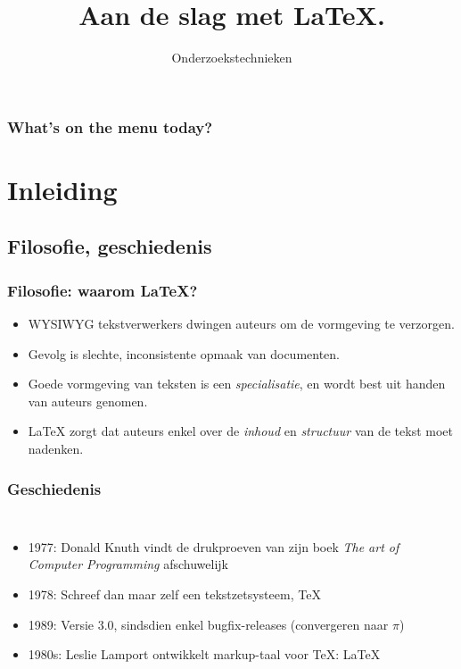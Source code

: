 \documentclass[aspectratio=169]{beamer}
\title{Aan de slag met \LaTeX.}
\subtitle{Onderzoekstechnieken}
\begin{document}
\begin{frame}
  \maketitle
\end{frame}

\begin{frame}
  \frametitle{What's on the menu today?}

  \tableofcontents
\end{frame}


\section{Inleiding}

\subsection{Filosofie, geschiedenis}

\begin{frame}
  \frametitle{Filosofie: waarom {\LaTeX}?}

  \begin{itemize}
    \item<+-> WYSIWYG tekstverwerkers dwingen auteurs om de vormgeving te verzorgen.
    \item<+-> Gevolg is slechte, inconsistente opmaak van documenten.
    \item<+-> Goede vormgeving van teksten is een \textit{specialisatie}, en wordt best
    uit handen van auteurs genomen.
    \item<+-> {\LaTeX} zorgt dat auteurs enkel over de \textit{inhoud} en \textit{structuur} van de tekst moet nadenken.
  \end{itemize}
\end{frame}

\begin{frame}[plain]
  \frametitle{Geschiedenis}

  \begin{columns}[c]

    \begin{itemize}
      \item<+-> 1977: Donald Knuth vindt de drukproeven van zijn boek \textit{The art of Computer Programming} afschuwelijk
      \item<+-> 1978: Schreef dan maar zelf een tekstzetsysteem, {\TeX}
      \item<+-> 1989: Versie 3.0, sindsdien enkel bugfix-releases (convergeren naar \(\pi\))
      \item<+-> 1980s: Leslie Lamport ontwikkelt markup-taal voor {\TeX}: {\LaTeX}
    \end{itemize}

    \begin{center}
    \end{center}

  \end{columns}
\end{frame}
\end{document}
